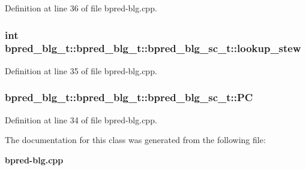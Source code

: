 Definition at line 36 of file bpred-blg.cpp.
\subsubsection[{lookup\_\-stew}]{\setlength{\rightskip}{0pt plus 5cm}int bpred\_\-blg\_\-t::bpred\_\-blg\_\-t::bpred\_\-blg\_\-sc\_\-t::lookup\_\-stew}\label{classbpred__blg__t_1_1bpred__blg__sc__t_548962a735226f18fd7b394721fe442d}




Definition at line 35 of file bpred-blg.cpp.
\subsubsection[{PC}]{ bpred\_\-blg\_\-t::bpred\_\-blg\_\-t::bpred\_\-blg\_\-sc\_\-t::PC}\label{classbpred__blg__t_1_1bpred__blg__sc__t_0d7439fb64a8c76ef7e23eea916cb5b3}




Definition at line 34 of file bpred-blg.cpp.

The documentation for this class was generated from the following file:\begin{CompactItemize}
\item 
{\bf bpred-blg.cpp}\end{CompactItemize}
